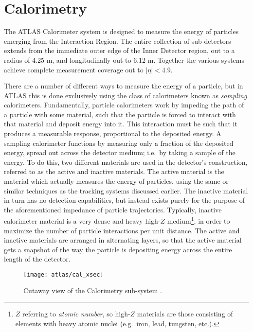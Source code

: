 \section{Calorimetry} \label{sec:calorimeter}

    The ATLAS Calorimeter system is designed to measure the energy of particles emerging from the Interaction Region.
    The entire collection of sub-detectors extends from the immediate outer edge of the Inner Detector region, out to a radius of 4.25 m, and longitudinally out to 6.12 m.
    Together the various systems achieve complete measurement coverage out to $|\eta| < 4.9$.

    There are a number of different ways to measure the energy of a particle, but in ATLAS this is done exclusively using the class of calorimeters known as \textit{sampling} calorimeters.
    Fundamentally, particle calorimeters work by impeding the path of a particle with some material, such that the particle is forced to interact with that material and deposit energy into it.
    This interaction must be such that it produces a measurable response, proportional to the deposited energy.
    A sampling calorimeter functions by measuring only a fraction of the deposited energy, spread out across the detector medium; i.e.\ by taking a sample of the energy.
    To do this, two different materials are used in the detector's construction, referred to as the active and inactive materials.
    The active material is the material which actually measures the energy of particles, using the same or similar techniques as the tracking systems discussed earlier.
    The inactive material in turn has no detection capabilities, but instead exists purely for the purpose of the aforementioned impedance of particle trajectories.
    Typically, inactive calorimeter material is a very dense and heavy high-$Z$ medium\footnote{
            $Z$ referring to \textit{atomic number},
                so high-$Z$ materials are those consisting of elements with heavy atomic nuclei (e.g.\ iron, lead, tungsten, etc.).
        }, in order to maximize the number of particle interactions per unit distance.
    The active and inactive materials are arranged in alternating layers, so that the active material gets a snapshot of the way the particle is depositing energy across the entire length of the detector.\cite{energy_measurement}

    \begin{figure}
        \texttt{[image: atlas/cal\_xsec]}
        \caption{Cutaway view of the Calorimetry sub-system \cite{atlas_tdr}.}
        \label{fig:cal_xsec}
    \end{figure}

